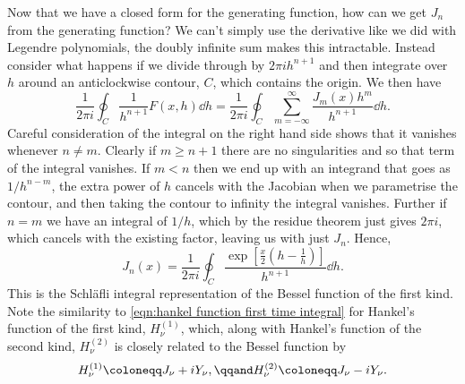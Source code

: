 \documentclass[fleqn]{NotesClass}
\begin{document}
    Now that we have a closed form for the generating function, how can we get \(J_n\) from the generating function?
    We can't simply use the derivative like we did with Legendre polynomials, the doubly infinite sum makes this intractable.
    Instead consider what happens if we divide through by \(2\pi i h^{n+1}\) and then integrate over \(h\) around an anticlockwise contour, \(C\), which contains the origin.
    We then have
    \begin{equation}
        \frac{1}{2\pi i} \oint_C \frac{1}{h^{n+1}} F(x, h) \dd{h} = \frac{1}{2\pi i} \oint_C \sum_{m=-\infty}^{\infty} \frac{J_m(x)h^m}{h^{n+1}} \dd{h}.
    \end{equation}
    Careful consideration of the integral on the right hand side shows that it vanishes whenever \(n \ne m\).
    Clearly if \(m \ge n + 1\) there are no singularities and so that term of the integral vanishes.
    If \(m < n\) then we end up with an integrand that goes as \(1/h^{n - m}\), the extra power of \(h\) cancels with the Jacobian when we parametrise the contour, and then taking the contour to infinity the integral vanishes.
    Further if \(n = m\) we have an integral of \(1/h\), which by the residue theorem just gives \(2\pi i\), which cancels with the existing factor, leaving us with just \(J_n\).
    Hence,
    \begin{equation}
        J_{n}(x) = \frac{1}{2\pi i} \oint_C \frac{\exp\left[ \frac{x}{2}\left( h - \frac{1}{h} \right) \right]}{h^{n + 1}} \dd{h}.
    \end{equation}
    This is the Schl\"afli integral representation of the Bessel function of the first kind.
    Note the similarity to \cref{eqn:hankel function first time integral} for Hankel's function of the first kind, \(H_\nu^{(1)}\), which, along with Hankel's function of the second kind, \(H_\nu^{(2)}\) is closely related to the Bessel function by
    \begin{equation}
        H_\nu^{(1)} \coloneqq J_\nu + iY_\nu, \qqand H_\nu^{(2)} \coloneqq J_\nu - iY_\nu.
    \end{equation}
\end{document}
